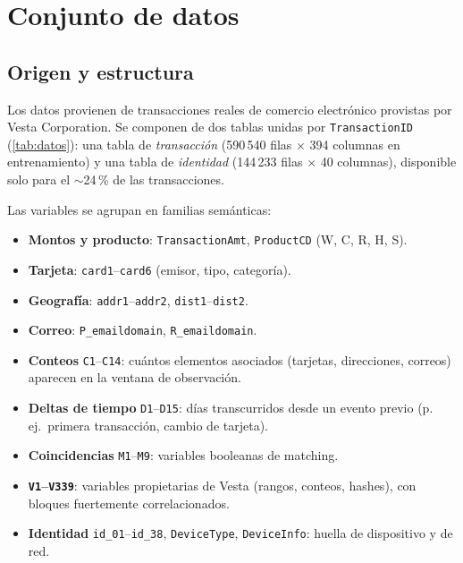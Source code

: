 \chapter{Conjunto de datos}
\label{cap:datos}

\section{Origen y estructura}

Los datos provienen de transacciones reales de comercio electrónico provistas por Vesta
Corporation. Se componen de dos tablas unidas por \texttt{TransactionID}
(\cref{tab:datos}): una tabla de \emph{transacción} (590\,540 filas $\times$ 394 columnas en
entrenamiento) y una tabla de \emph{identidad} (144\,233 filas $\times$ 40 columnas), disponible
solo para el $\sim$24\,\% de las transacciones.

\begin{table}[ht]
  \centering
  \caption{Resumen de los archivos del conjunto de datos.}
  \label{tab:datos}
  
\end{table}

Las variables se agrupan en familias semánticas:

\begin{itemize}
  \item \textbf{Montos y producto}: \texttt{TransactionAmt}, \texttt{ProductCD} (W, C, R, H, S).
  \item \textbf{Tarjeta}: \texttt{card1}--\texttt{card6} (emisor, tipo, categoría).
  \item \textbf{Geografía}: \texttt{addr1}--\texttt{addr2}, \texttt{dist1}--\texttt{dist2}.
  \item \textbf{Correo}: \texttt{P\_emaildomain}, \texttt{R\_emaildomain}.
  \item \textbf{Conteos} \texttt{C1}--\texttt{C14}: cuántos elementos asociados (tarjetas,
        direcciones, correos) aparecen en la ventana de observación.
  \item \textbf{Deltas de tiempo} \texttt{D1}--\texttt{D15}: días transcurridos desde un evento
        previo (p.\,ej.\ primera transacción, cambio de tarjeta).
  \item \textbf{Coincidencias} \texttt{M1}--\texttt{M9}: variables booleanas de matching.
  \item \textbf{\texttt{V1}--\texttt{V339}}: variables propietarias de Vesta (rangos, conteos,
        hashes), con bloques fuertemente correlacionados.
  \item \textbf{Identidad} \texttt{id\_01}--\texttt{id\_38}, \texttt{DeviceType},
        \texttt{DeviceInfo}: huella de dispositivo y de red.
\end{itemize}

